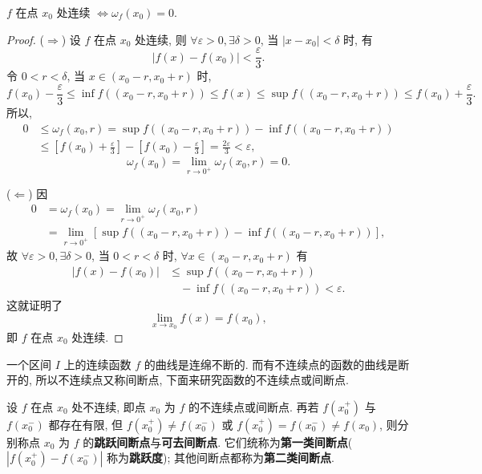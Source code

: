 \begin{theorem}\label{thm:2.4.6}
$f$ 在点 $x_0$ 处连续 $\iff \omega_f(x_0) = 0$.
\end{theorem}

\begin{proof}
($\Rightarrow$) 设 $f$ 在点 $x_0$ 处连续, 则 $\forall \varepsilon > 0, \exists \delta > 0$, 当 $|x - x_0| < \delta$ 时, 有
\[
|f(x) - f(x_0)| < \frac{\varepsilon}{3}.
\]
令 $0 < r < \delta$, 当 $x \in (x_0 - r, x_0 + r)$ 时,
\[
f(x_0) - \frac{\varepsilon}{3} \leqslant \inf f((x_0 - r, x_0 + r)) \leqslant f(x) \leqslant \sup f((x_0 - r, x_0 + r)) \leqslant f(x_0) + \frac{\varepsilon}{3}.
\]
所以,
\begin{align*}
0 &\leqslant \omega_f(x_0, r) = \sup f((x_0 - r, x_0 + r)) - \inf f((x_0 - r, x_0 + r)) \\
&\leqslant \left[f(x_0) + \frac{\varepsilon}{3}\right] - \left[f(x_0) - \frac{\varepsilon}{3}\right] = \frac{2\varepsilon}{3} < \varepsilon,
\end{align*}
\[
\omega_f(x_0) = \lim_{r \to 0^+} \omega_f(x_0, r) = 0.
\]

($\Leftarrow$) 因
\begin{align*}
0 &= \omega_f(x_0) = \lim_{r \to 0^+} \omega_f(x_0, r) \\
&= \lim_{r \to 0^+} \left[\sup f((x_0 - r, x_0 + r)) - \inf f((x_0 - r, x_0 + r))\right],
\end{align*}
故 $\forall \varepsilon > 0, \exists \delta > 0$, 当 $0 < r < \delta$ 时, $\forall x \in (x_0 - r, x_0 + r)$ 有
\begin{align*}
|f(x) - f(x_0)| &\leqslant \sup f((x_0 - r, x_0 + r)) \\
&\quad - \inf f((x_0 - r, x_0 + r)) < \varepsilon.
\end{align*}
这就证明了
\[
\lim_{x \to x_0} f(x) = f(x_0),
\]
即 $f$ 在点 $x_0$ 处连续.
\end{proof}

一个区间 $I$ 上的连续函数 $f$ 的曲线是连绵不断的. 而有不连续点的函数的曲线是断开的, 所以不连续点又称间断点, 下面来研究函数的不连续点或间断点.

\begin{definition}\label{def:2.4.3}
设 $f$ 在点 $x_0$ 处不连续, 即点 $x_0$ 为 $f$ 的不连续点或间断点. 再若 $f(x_0^+)$ 与 $f(x_0^-)$ 都存在有限, 但 $f(x_0^+) \neq f(x_0^-)$ 或 $f(x_0^+) = f(x_0^-) \neq f(x_0)$, 则分别称点 $x_0$ 为 $f$ 的\textbf{跳跃间断点}与\textbf{可去间断点}. 它们统称为\textbf{第一类间断点}($|f(x_0^+) - f(x_0^-)|$ 称为\textbf{跳跃度}); 其他间断点都称为\textbf{第二类间断点}.
\end{definition}


